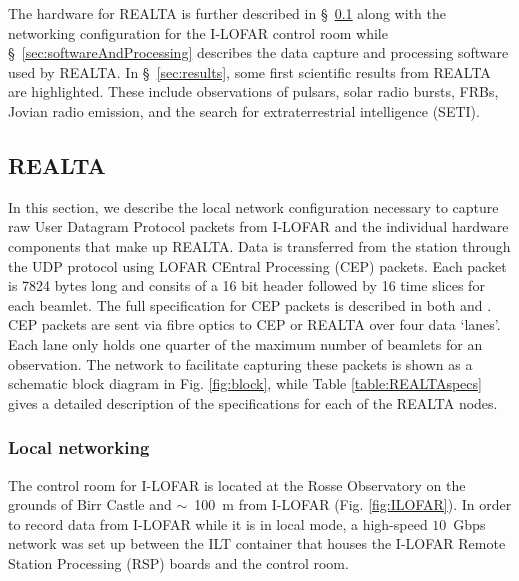 The hardware for REALTA is further described in \S~\ref{sec:REALTA} along with the networking configuration for the I-LOFAR control room while \S~\ref{sec:softwareAndProcessing} describes the data capture and processing software used by REALTA. In \S~\ref{sec:results}, some first scientific results from REALTA are highlighted. These include observations of pulsars, solar radio bursts, FRBs, Jovian radio emission, and the search for extraterrestrial intelligence (SETI).  %

\subsection{REALTA}
\label{sec:REALTA}
In this section, we describe the local network configuration necessary to capture raw User Datagram Protocol \citep[UDP;][]{Postel} packets from I-LOFAR and the individual hardware components that make up REALTA. Data is transferred from the station through the UDP protocol using LOFAR CEntral Processing (CEP) packets. Each packet is 7824 bytes long and consits of a 16 bit header followed by 16 time slices for each beamlet. The full specification for CEP packets is described in both \cite{Lubberhuizen2009} and \citet{Virtanen2018}.  CEP packets are sent via fibre optics to CEP or REALTA over four data `lanes'. Each lane only holds one quarter of the maximum number of beamlets for an observation.
The network to facilitate capturing these packets is shown as a schematic block diagram in Fig. \ref{fig:block}, while Table \ref{table:REALTAspecs} gives a detailed description of the specifications for each of the REALTA nodes. 

\subsubsection{Local networking}
\label{sec:network}
The control room for I-LOFAR is located at the Rosse Observatory on the grounds of Birr Castle and $\sim$~100~m from I-LOFAR (Fig. \ref{fig:ILOFAR}). In order to record data from I-LOFAR while it is in local mode, a high-speed $10$~Gbps network was set up between the ILT container that houses the I-LOFAR Remote Station Processing (RSP) boards and the control room.

